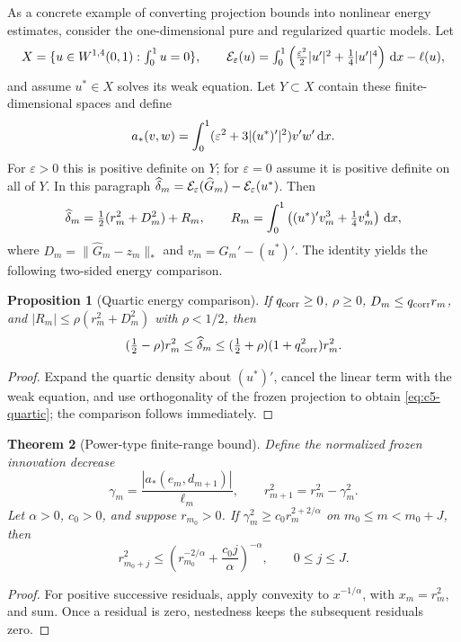 \documentclass[11pt]{article}
\newtheorem{theorem}{Theorem}[section]
\newtheorem{proposition}[theorem]{Proposition}
\theoremstyle{remark}\newtheorem{remark}[theorem]{Remark}
\begin{document}
As a concrete example of converting projection bounds into nonlinear
energy estimates, consider the one-dimensional pure and regularized
quartic models. Let
\[
 X=\{u\in W^{1,4}(0,1):\textstyle\int_0^1u=0\},\qquad
 \mathcal E_\varepsilon(u)=\int_0^1
 \left(\tfrac{\varepsilon^2}{2}|u'|^2+\tfrac14|u'|^4\right)\,\mathrm d x-\ell(u),
\]
and assume $u^*\in X$ solves its weak equation.  Let $Y\subset X$ contain
these finite-dimensional spaces and define
\[
 a_*(v,w)=\int_0^1(\varepsilon^2+3|(u^*)'|^2)v'w'\,\mathrm d x.
\]
For $\varepsilon>0$ this is positive definite on $Y$; for $\varepsilon=0$ assume
it is positive definite on all of $Y$.  In this paragraph
$\widehat\delta_m=\mathcal E_\varepsilon(\widehat G_m)-\mathcal E_\varepsilon(u^*)$.  Then
\begin{equation}
 \widehat\delta_m=\tfrac12(r_m^2+D_m^2)+R_m,
 \qquad
 R_m=\int_0^1\left((u^*)'v_m^3+\tfrac14v_m^4\right)\,\mathrm d x,
 \label{eq:c5-quartic}
\end{equation}
where $D_m=\|\widehat G_m-z_m\|_*$ and $v_m=\widehat G_m'-(u^*)'$. The identity yields the following two-sided energy comparison.
\begin{proposition}[Quartic energy comparison]
\label{prop:c5-quartic}
If $q_{\rm corr}\ge0$, $\rho\ge0$, $D_m\le q_{\rm corr}r_m$, and
$|R_m|\le\rho(r_m^2+D_m^2)$ with $\rho<1/2$, then
\begin{equation}
 (\tfrac12-\rho)r_m^2\le\widehat\delta_m\le
 (\tfrac12+\rho)(1+q_{\rm corr}^2)r_m^2.
 \label{eq:c5-quartic-comparison}
\end{equation}
\end{proposition}
\begin{proof}
Expand the quartic density about $(u^*)'$, cancel the linear term with the weak equation, and use orthogonality of the frozen projection to obtain \eqref{eq:c5-quartic}; the comparison follows immediately.
\end{proof}

\begin{theorem}[Power-type finite-range bound]
\label{thm:c5-power}
Define the normalized frozen innovation decrease
\[
 \gamma_m=\frac{|a_*(e_m,d_{m+1})|}{\ell_m},\qquad
 r_{m+1}^2=r_m^2-\gamma_m^2.
\]
Let $\alpha>0$, $c_0>0$, and suppose $r_{m_0}>0$.  If
$\gamma_m^2\ge c_0r_m^{2+2/\alpha}$ on
$m_0\le m<m_0+J$, then
\begin{equation}
 r_{m_0+j}^2\le\left(r_{m_0}^{-2/\alpha}+\frac{c_0j}{\alpha}\right)^{-\alpha},
 \qquad 0\le j\le J.
 \label{eq:c5-power}
\end{equation}
\end{theorem}
\begin{proof}
For positive successive residuals, apply convexity to
\(x^{-1/\alpha}\), with \(x_m=r_m^2\), and sum.
Once a residual is zero, nestedness keeps the subsequent residuals zero.
\end{proof}
\end{document}
